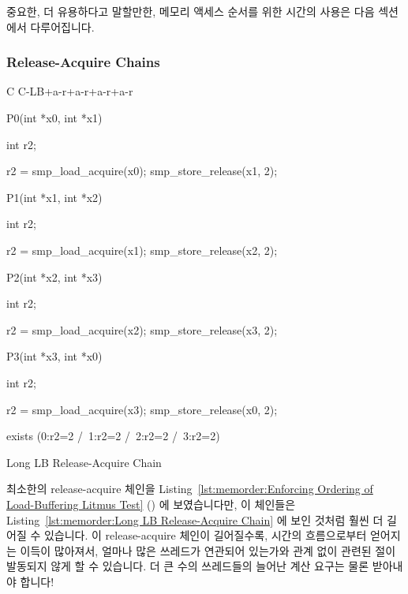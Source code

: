 중요한, 더 유용하다고 말할만한, 메모리 액세스 순서를 위한 시간의 사용은 다음
섹션에서 다루어집니다.

\subsubsection{Release-Acquire Chains}
\label{sec:memorder:Release-Acquire Chains}

\begin{listing}[tbp]
{ \scriptsize
\begin{verbbox}[\LstLineNo]
C C-LB+a-r+a-r+a-r+a-r
{
}

P0(int *x0, int *x1)
{
  int r2;

  r2 = smp_load_acquire(x0);
  smp_store_release(x1, 2);
}


P1(int *x1, int *x2)
{
  int r2;

  r2 = smp_load_acquire(x1);
  smp_store_release(x2, 2);
}

P2(int *x2, int *x3)
{
  int r2;

  r2 = smp_load_acquire(x2);
  smp_store_release(x3, 2);
}

P3(int *x3, int *x0)
{
  int r2;

  r2 = smp_load_acquire(x3);
  smp_store_release(x0, 2);
}

exists (0:r2=2 /\ 1:r2=2 /\ 2:r2=2 /\ 3:r2=2)
\end{verbbox}
}
\centering
\theverbbox
\caption{Long LB Release-Acquire Chain}
\label{lst:memorder:Long LB Release-Acquire Chain}
\end{listing}

최소한의 release-acquire 체인을
Listing~\ref{lst:memorder:Enforcing Ordering of Load-Buffering Litmus Test}
()
에 보였습니다만, 이 체인들은
Listing~\ref{lst:memorder:Long LB Release-Acquire Chain}
에 보인 것처럼 훨씬 더 길어질 수 있습니다.
이 release-acquire 체인이 길어질수록, 시간의 흐름으로부터 얻어지는 이득이
많아져서, 얼마나 많은 쓰레드가 연관되어 있는가와 관계 없이 관련된 
절이 발동되지 않게 할 수 있습니다.
더 큰 수의 쓰레드들의 늘어난 계산 요구는 물론 받아내야 합니다!

